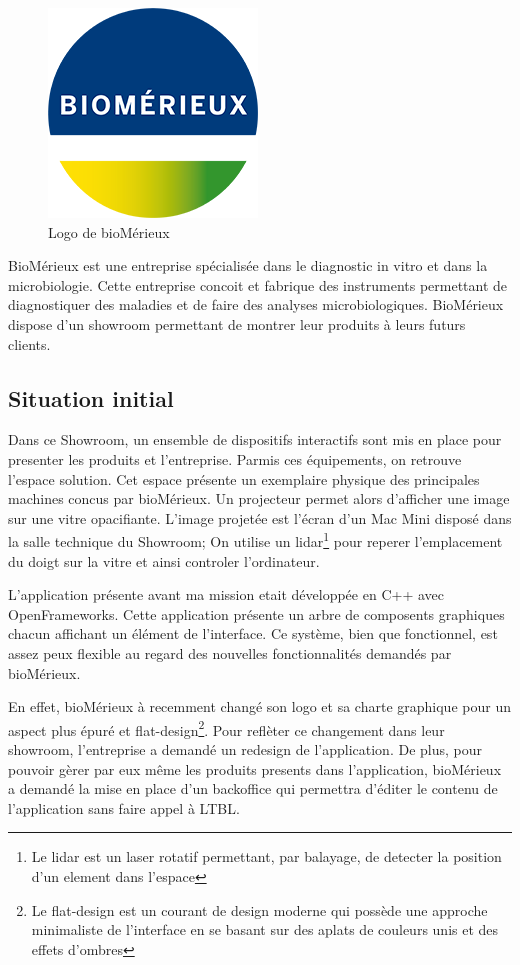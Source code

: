 \usepackage{graphicx}

\begin{figure}[h]
    \centering
    \includegraphics[scale=0.5]{img/bmx.png}
    \caption{Logo de bioMérieux}
\end{figure}

BioMérieux est une entreprise spécialisée dans le diagnostic in vitro et dans la microbiologie.
Cette entreprise concoit et fabrique des instruments permettant de diagnostiquer des maladies et de faire des analyses microbiologiques.
BioMérieux dispose d'un showroom permettant de montrer leur produits à leurs futurs clients.

\subsection{Situation initial}

Dans ce Showroom, un ensemble de dispositifs interactifs sont mis en place pour presenter les produits et l'entreprise.
Parmis ces équipements, on retrouve l'espace solution.
Cet espace présente un exemplaire physique des principales machines concus par bioMérieux.
Un projecteur permet alors d'afficher une image sur une vitre opacifiante.
L'image projetée est l'écran d'un Mac Mini disposé dans la salle technique du Showroom;
On utilise un lidar\footnote{Le lidar est un laser rotatif permettant, par balayage, de detecter la position d'un element dans l'espace} pour reperer l'emplacement du doigt sur la vitre et ainsi controler l'ordinateur.

L'application présente avant ma mission etait développée en C++ avec OpenFrameworks.
Cette application présente un arbre de composents graphiques chacun affichant un élément de l'interface.
Ce système, bien que fonctionnel, est assez peux flexible au regard des nouvelles fonctionnalités demandés par bioMérieux.

En effet, bioMérieux à recemment changé son logo et sa charte graphique pour un aspect plus épuré et flat-design\footnote{Le flat-design est un courant de design moderne qui possède une approche minimaliste de l'interface en se basant sur des aplats de couleurs unis et des effets d'ombres}.
Pour reflèter ce changement dans leur showroom, l'entreprise a demandé un redesign de l'application.
De plus, pour pouvoir gèrer par eux même les produits presents dans l'application, bioMérieux a demandé la mise en place d'un backoffice qui permettra d'éditer le contenu de l'application sans faire appel à LTBL.


